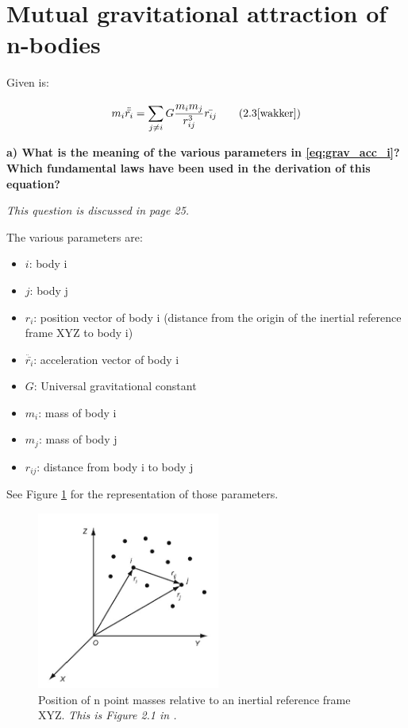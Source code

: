 \section{Mutual gravitational attraction of n-bodies}\label{sec:q1}

Given is:

\begin{equation}
    m_{i} \ddot{\bar{r_{i}}} = \sum_{j \neq i}^{} G \frac{m_{i}m_{j}}{r_{ij}^3} \bar{r_{ij}}
    \tag{2.3\cite{wakker}}
    \label{eq:grav_acc_i}
\end{equation}

\noindent \textbf{a) What is the meaning of the various parameters in \ref{eq:grav_acc_i}? Which fundamental laws have been used in the derivation of this equation?}

\bigskip

\noindent \textit{This question is discussed in \cite{wakker} page 25.}

\bigskip

\noindent The various parameters are:

\begin{itemize}
    \item $i$: body i
    \item $j$: body j
    \item $r_i$: position vector of body i (distance from the origin of the inertial reference frame XYZ to body i)
    \item $\ddot{\bar{r_i}}$: acceleration vector of body i
    \item $G$: Universal gravitational constant
    \item $m_i$: mass of body i
    \item $m_j$: mass of body j
    \item $r_{ij}$: distance from body i to body j
\end{itemize}

\noindent See Figure \ref{fig:grav_acc_i} for the representation of those parameters.

\begin{figure}[ht]
    \centering
    \includegraphics[width=6cm]{img/grav_acc.jpg}
    \caption{Position of n point masses relative to an inertial reference frame XYZ. \textit{This is Figure 2.1 in \cite{wakker}.}}
    \label{fig:grav_acc_i}
\end{figure}

